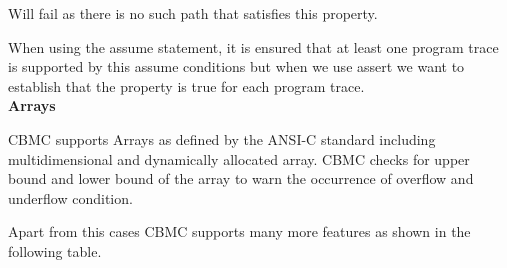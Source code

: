Will fail as there is no such path that satisfies this property.

When using the assume statement, it is ensured that at least one program trace 
is supported by this assume conditions but when we use assert we want to establish
that the property is true for each program trace. \\
 
 \textbf{Arrays}
 
 CBMC supports Arrays as defined by the ANSI-C standard including multidimensional
 and dynamically allocated array. CBMC checks for upper bound and lower bound of
 the array to warn the occurrence of  overflow and underflow condition.
 
 Apart from this cases CBMC supports many more features as shown in the following table.
 
